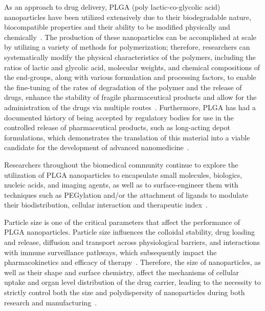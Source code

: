 \documentclass[10pt]{NSP1}
\begin{document}
As an approach to drug delivery, PLGA (poly lactic-co-glycolic acid) nanoparticles have been
utilized extensively due to their biodegradable nature, biocompatible properties and their ability
to be modified physically and chemically~\cite{ref1,NEW1}. The production of these nanoparticles can be
accomplished at scale by utilizing a variety of methods for polymerization; therefore, researchers
can systematically modify the physical characteristics of the polymers, including the ratios of
lactic and glycolic acid, molecular weights, and chemical compositions of the end-groups, along
with various formulation and processing factors, to enable the fine-tuning of the rates of
degradation of the polymer and the release of drugs, enhance the stability of fragile
pharmaceutical products and allow for the administration of the drugs via multiple routes~\cite{ref2,NEW2}.
Furthermore, PLGA has had a documented history of being accepted by regulatory bodies for use in
the controlled release of pharmaceutical products, such as long-acting depot formulations, which
demonstrates the translation of this material into a viable candidate for the development of
advanced nanomedicine~\cite{ref2,ref3}.

Researchers throughout the biomedical community continue to explore the utilization of PLGA
nanoparticles to encapsulate small molecules, biologics, nucleic acids, and imaging agents, as well
as to surface-engineer them with techniques such as PEGylation and/or the attachment of ligands to
modulate their biodistribution, cellular interaction and therapeutic index~\cite{NEW3,ref4}.

Particle size is one of the critical parameters that affect the performance of PLGA nanoparticles.
Particle size influences the colloidal stability, drug loading and release, diffusion and transport
across physiological barriers, and interactions with immune surveillance pathways, which subsequently
impact the pharmacokinetics and efficacy of therapy~\cite{ref5,ref6,NEW4}. Therefore, the size of
nanoparticles, as well as their shape and surface chemistry, affect the mechanisms of cellular
uptake and organ level distribution of the drug carrier, leading to the necessity to strictly
control both the size and polydispersity of nanoparticles during both research and
manufacturing~\cite{ref7,ref8,NEW5}.
\end{document}
